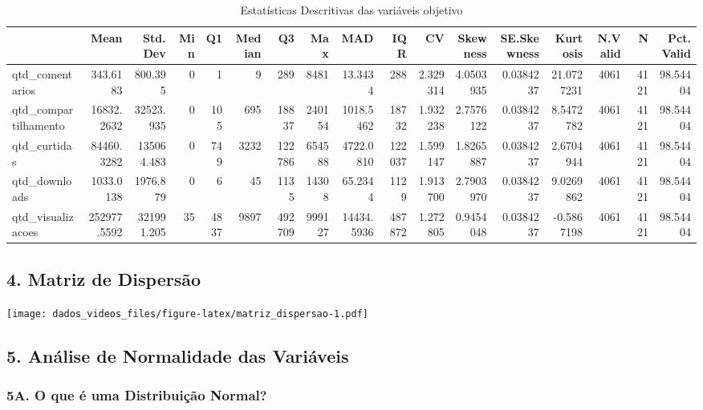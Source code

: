 \documentclass[
]{article}
\begin{document}
\begin{table}
\centering
\caption{\label{tab:estatisticas_descritivas}Estatísticas Descritivas das variáveis objetivo}
\centering
\begin{tabular}[t]{l|r|r|r|r|r|r|r|r|r|r|r|r|r|r|r|r}
\hline
  & Mean & Std.Dev & Min & Q1 & Median & Q3 & Max & MAD & IQR & CV & Skewness & SE.Skewness & Kurtosis & N.Valid & N & Pct.Valid\\
\hline
qtd\_comentarios & 343.6183 & 800.395 & 0 & 1 & 9 & 289 & 8481 & 13.3434 & 288 & 2.329314 & 4.0503935 & 0.0384237 & 21.0727231 & 4061 & 4121 & 98.54404\\
\hline
qtd\_compartilhamento & 16832.2632 & 32523.935 & 0 & 105 & 695 & 18837 & 240154 & 1018.5462 & 18732 & 1.932238 & 2.7576122 & 0.0384237 & 8.5472782 & 4061 & 4121 & 98.54404\\
\hline
qtd\_curtidas & 84460.3282 & 135064.483 & 0 & 749 & 3232 & 122786 & 654588 & 4722.0810 & 122037 & 1.599147 & 1.8265887 & 0.0384237 & 2.6704944 & 4061 & 4121 & 98.54404\\
\hline
qtd\_downloads & 1033.0138 & 1976.879 & 0 & 6 & 45 & 1135 & 14308 & 65.2344 & 1129 & 1.913700 & 2.7903970 & 0.0384237 & 9.0269862 & 4061 & 4121 & 98.54404\\
\hline
qtd\_visualizacoes & 252977.5592 & 321991.205 & 35 & 4837 & 9897 & 492709 & 999127 & 14434.5936 & 487872 & 1.272805 & 0.9454048 & 0.0384237 & -0.5867198 & 4061 & 4121 & 98.54404\\
\hline
\end{tabular}
\end{table}

\subsection{4. Matriz de Dispersão}\label{matriz-de-dispersuxe3o}

\texttt{[image: dados\_videos\_files/figure-latex/matriz\_dispersao-1.pdf]}

\subsection{5. Análise de Normalidade das
Variáveis}\label{anuxe1lise-de-normalidade-das-variuxe1veis}

\subsubsection{5A. O que é uma Distribuição
Normal?}\label{a.-o-que-uxe9-uma-distribuiuxe7uxe3o-normal}
\end{document}
